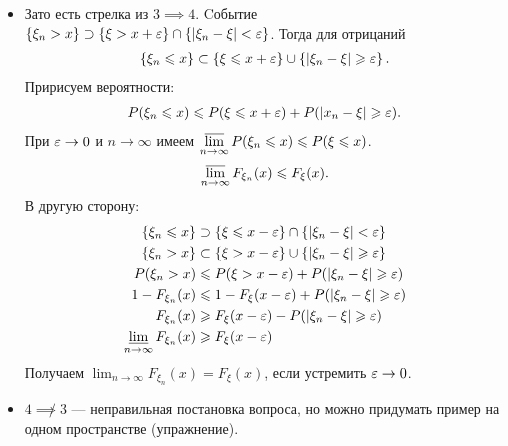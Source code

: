 \documentclass[../main.tex]{subfiles}
\begin{document}
\begin{itemize}
\item Зато есть стрелка из $ 3 \implies 4 $. Cобытие $ \left\{ \xi_n > x \right\} \supset \left\{ \xi > x + \varepsilon \right\} \cap \left\{ \left| \xi_n - \xi \right| < \varepsilon \right\}$. Тогда для отрицаний
\begin{align*}
 \left\{ \xi_n \leqslant x \right\} \subset \left\{ \xi \leqslant x + \varepsilon \right\} \cup \left\{ \left| \xi_n - \xi \right| \geqslant \varepsilon \right\}.
\end{align*} Пририсуем вероятности:
\begin{align*}
 P(\xi_n \leqslant x) \leqslant P(\xi \leqslant x + \varepsilon) + P(\left| x_n - \xi \right| \geqslant \varepsilon).
\end{align*} При $ \varepsilon \to 0 $ и $ n \to \infty $ имеем $ \varlimsup\limits_{n \to \infty} P(\xi_n \leqslant x) \leqslant P(\xi \leqslant x)   $.
\begin{align*}
 \varlimsup\limits_{n \to \infty} F_{\xi_n} (x) \leqslant F_{\xi}(x)
.\end{align*} В другую сторону:
\begin{align*}
	\left\{ \xi_n \leqslant x \right\} &\supset \left\{ \xi \leqslant x - \varepsilon \right\} \cap \left\{ \left| \xi_n - \xi \right| < \varepsilon \right\} \\
	\left\{ \xi_n > x \right\} &\subset \left\{ \xi > x - \varepsilon \right\} \cup \left\{ \left| \xi_n-\xi \right| \geqslant \varepsilon \right\} \\
	P(\xi_n > x) &\leqslant P(\xi > x - \varepsilon) + P(\left| \xi_n - \xi \right| \geqslant \varepsilon) \\
	1 - F_{\xi_n}(x) &\leqslant 1 - F_{\xi}(x - \varepsilon) + P(\left| \xi_n - \xi \right| \geqslant \varepsilon) \\
	F_{\xi_n}(x) &\geqslant F_\xi(x - \varepsilon) - P(\left|  \xi_n - \xi \right| \geqslant \varepsilon) \\
	\varliminf_{n \to \infty} F_{\xi_n}(x) &\geqslant F_{\xi}(x - \varepsilon)
\end{align*} Получаем $ \lim_{n \to \infty} F_{\xi_n}(x) = F_{\xi}(x) $, если устремить $ \varepsilon \to 0 $.

\item $ 4 \not \implies 3 $ --- неправильная постановка вопроса, но можно придумать пример на одном пространстве (упражнение).

\end{itemize}
\end{document}
